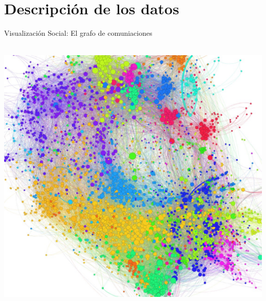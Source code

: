 \documentclass[xcolor=x11names]{beamer}
\begin{document}
%

\section{ Descripción de los datos}

\begin{frame}{Visualización Social: El grafo de comuniaciones}



		\center\
		\includegraphics[width = 1.0 \textwidth, trim = 0 0 0 0cm, clip = true]{slides/Graph-screenshot.jpg}

\end{frame}
\end{document}
